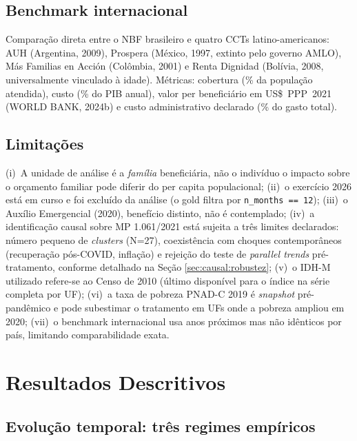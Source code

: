\documentclass[12pt,a4paper,oneside]{article}
\begin{document}
\subsection{Benchmark internacional}

Comparação direta entre o NBF brasileiro e quatro CCTs
latino-americanos: AUH (Argentina, 2009\textendash), Prospera
(México, 1997, extinto pelo governo
AMLO), Más Familias en Acción (Colômbia, 2001\textendash) e
Renta Dignidad (Bolívia, 2008\textendash, universalmente vinculado
à idade). Métricas: cobertura (\% da população atendida), custo
(\% do PIB anual), valor per beneficiário em US\$~PPP~2021
(WORLD BANK, 2024b) e custo administrativo declarado
(\% do gasto total).

\subsection{Limitações}

(i)~A unidade de análise é a \textit{família} beneficiária, não o
indivíduo \textemdash{} o impacto sobre o orçamento familiar pode
diferir do per capita populacional;
(ii)~o exercício 2026 está em curso e foi excluído da análise (o
gold filtra por \texttt{n\_months == 12});
(iii)~o Auxílio Emergencial (2020), benefício
distinto, não é contemplado;
(iv)~a identificação causal sobre MP 1.061/2021 está sujeita a
três limites declarados: número pequeno de \textit{clusters}
(N=27), coexistência com choques contemporâneos (recuperação
pós-COVID, inflação) e rejeição do teste de \textit{parallel trends}
pré-tratamento, conforme detalhado na Seção
\ref{sec:causal:robustez};
(v)~o IDH-M utilizado refere-se ao Censo de 2010 (último
disponível para o índice na série completa por UF);
(vi)~a taxa de pobreza PNAD-C 2019 é \textit{snapshot}
pré-pandêmico e pode subestimar o tratamento em UFs onde a
pobreza ampliou em 2020;
(vii)~o benchmark internacional usa anos próximos mas não
idênticos por país, limitando comparabilidade exata.

\section{Resultados Descritivos}\label{sec:resultados}

\subsection{Evolução temporal: três regimes empíricos}
\end{document}
